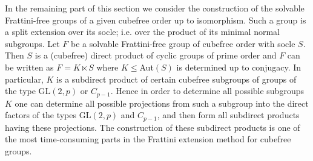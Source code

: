 In the remaining part of this section we consider the construction of the
solvable Frattini-free groups of a given cubefree order up to
isomorphism. Such a group is a split extension over its socle; i.e. over the
product of its minimal normal subgroups. Let $F$ be a solvable Frattini-free
group of cubefree order with socle $S$. Then $S$ is a (cubefree) direct product of cyclic
groups of prime order and $F$ can be written as $F=K\ltimes S$
where $K\leq$Aut$(S)$ is determined up to conjugacy. In particular, $K$ is a subdirect product of certain
cubefree subgroups of groups of the type GL$(2,p)$ or
$C_{p-1}$. Hence in order to determine all possible subgroups $K$ one can
determine all possible projections from such a subgroup into the direct factors
of the types GL$(2,p)$ and $C_{p-1}$, and then form all subdirect
products having these projections. The construction of these subdirect
products is one of the most time-consuming parts in the Frattini extension
method for cubefree groups.